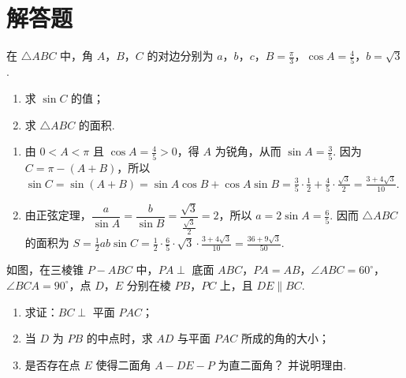 \section{解答题}

\begin{problem}
在 \(\triangle ABC\) 中，角 \(A\)，\(B\)，\(C\) 的对边分别为 \(a\)，\(b\)，\(c\)，\(B = \frac{\pi}{3}\)，\(\cos A = \frac{4}{5}\)，\(b = \sqrt{3}\).

\begin{enumerate}
\item 求 \(\sin C\) 的值；
\item 求 \(\triangle ABC\) 的面积.
\end{enumerate}
\end{problem}

\begin{solution}
\begin{enumerate}
\item 由 \(0<A<\pi\) 且 \(\cos A=\frac45>0\)，得 \(A\) 为锐角，从而 \(\sin A=\frac35\). 因为 \(C=\pi-(A+B)\)，所以 \(\sin C=\sin(A+B)=\sin A\cos B+\cos A\sin B=\frac35\cdot\frac12+\frac45\cdot\frac{\sqrt3}{2}=\frac{3+4\sqrt3}{10}\).
\item 由正弦定理，\(\dfrac{a}{\sin A}=\dfrac{b}{\sin B}=\dfrac{\sqrt3}{\frac{\sqrt3}{2}}=2\)，所以 \(a=2\sin A=\frac65\). 因而 \(\triangle ABC\) 的面积为 \(S=\frac12ab\sin C=\frac12\cdot\frac65\cdot\sqrt3\cdot\frac{3+4\sqrt3}{10}=\frac{36+9\sqrt3}{50}\).
\end{enumerate}
\end{solution}

\begin{problem}
如图，在三棱锥 \(P-ABC\) 中，\(PA \perp\) 底面 \(ABC\)，\(PA = AB\)，\(\angle ABC = 60^\circ\)，\(\angle BCA = 90^\circ\)，点 \(D\)，\(E\) 分别在棱 \(PB\)，\(PC\) 上，且 \(DE \parallel BC\).

\begin{enumerate}
\item 求证：\(BC \perp\) 平面 \(PAC\)；
\item 当 \(D\) 为 \(PB\) 的中点时，求 \(AD\) 与平面 \(PAC\) 所成的角的大小；
\item 是否存在点 \(E\) 使得二面角 \(A - DE - P\) 为直二面角？ 并说明理由.
\end{enumerate}

\end{problem}

